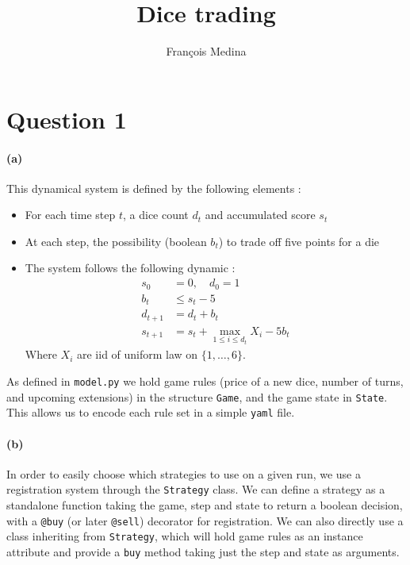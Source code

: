 \documentclass{article}
\title{Dice trading}
\author{François Medina}
\newcommand{\dice}{\{1,\dots,6\}}
\begin{document}
    \maketitle
    \section*{Question 1}
    \paragraph{(a)}
    This dynamical system is defined by the following elements :
    \begin{itemize}
        \item For each time step $t$,
            a dice count $d_t$ and accumulated score $s_t$
        \item At each step, the possibility (boolean $b_t$)
            to trade off five points for a die
        \item The system follows the following dynamic :
            \begin{align}
                s_0 &= 0,\quad d_0 = 1\\
                b_t &\leq s_t - 5\\
                d_{t+1} &= d_t + b_t\\
                s_{t+1} &= s_t + \max_{1\leq i\leq d_t}X_i - 5b_t
            \end{align}
            Where $X_i$ are iid of uniform law on $\dice$.
    \end{itemize}
    As defined in \texttt{model.py} we hold game rules
    (price of a new dice, number of turns, and upcoming extensions)
    in the structure \texttt{Game}, and the game state in \texttt{State}.
    This allows us to encode each rule set in a simple \texttt{yaml} file.

    \paragraph{(b)}
    In order to easily choose which strategies to use on a given run,
    we use a registration system through the \texttt{Strategy} class.
    We can define a strategy as a standalone function taking the game,
    step and state to return a boolean decision, with a \texttt{@buy}
    (or later \texttt{@sell}) decorator for registration.
    We can also directly use a class inheriting from \texttt{Strategy},
    which will hold game rules as an instance attribute and provide a
    \texttt{buy} method taking just the step and state as arguments.
\end{document}
